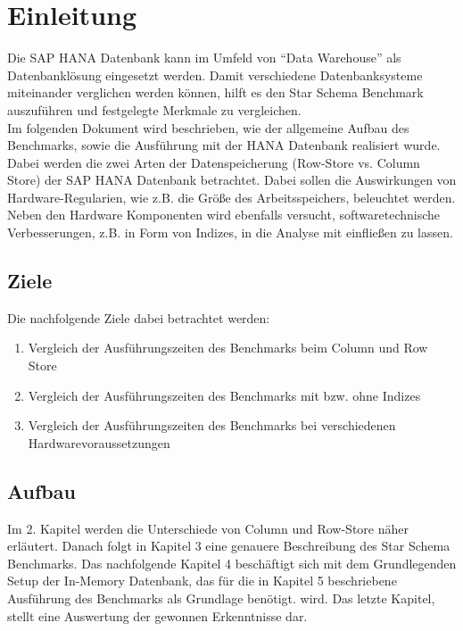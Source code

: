 \chapter{Einleitung}

Die SAP HANA Datenbank kann im Umfeld von \enquote{Data Warehouse} als Datenbanklösung eingesetzt werden. Damit verschiedene Datenbanksysteme miteinander verglichen werden können, hilft es den Star Schema Benchmark auszuführen und festgelegte Merkmale zu vergleichen.\\Im folgenden Dokument wird beschrieben, wie der allgemeine Aufbau des Benchmarks, sowie die Ausführung mit der HANA Datenbank realisiert wurde. Dabei werden die zwei Arten der Datenspeicherung (Row-Store vs. Column Store) der SAP HANA Datenbank betrachtet. Dabei sollen die Auswirkungen von Hardware-Regularien, wie z.B. die Größe des Arbeitsspeichers, beleuchtet werden. Neben den Hardware Komponenten wird ebenfalls versucht, softwaretechnische Verbesserungen, z.B. in Form von Indizes, in die Analyse mit einfließen zu lassen.

\section{Ziele}
Die nachfolgende Ziele dabei betrachtet werden:
\begin{enumerate}
	\item Vergleich der Ausführungszeiten des Benchmarks beim Column und Row Store
	\item Vergleich der Ausführungszeiten des Benchmarks mit bzw. ohne Indizes
	\item Vergleich der Ausführungszeiten des Benchmarks bei verschiedenen Hardwarevoraussetzungen
\end{enumerate}

\section{Aufbau}
Im 2. Kapitel werden die Unterschiede von Column und Row-Store näher erläutert. Danach folgt in Kapitel 3 eine genauere Beschreibung des Star Schema Benchmarks. Das nachfolgende Kapitel 4 beschäftigt sich mit dem Grundlegenden Setup der In-Memory Datenbank, das für die in Kapitel 5 beschriebene Ausführung des Benchmarks als Grundlage benötigt. wird. Das letzte Kapitel, stellt eine Auswertung der gewonnen Erkenntnisse dar.
